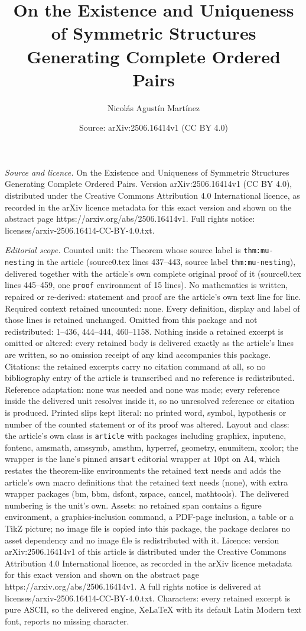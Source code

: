 \documentclass[10pt,a4paper]{amsart}
\title[On the Existence and Uniqueness of Symmetric Structures Gene]{On the Existence and Uniqueness of Symmetric Structures Generating Complete Ordered Pairs}
\author{Nicol\'as Agust\'in Mart\'inez}
\date{Source: arXiv:2506.16414v1 (CC BY 4.0)}
\begin{document}
\maketitle

\noindent\emph{Source and licence.} On the Existence and Uniqueness of Symmetric Structures Generating Complete Ordered Pairs. Version arXiv:2506.16414v1 (CC BY 4.0), distributed under the Creative Commons Attribution 4.0 International licence, as recorded in the arXiv licence metadata for this exact version and shown on the abstract page https://arxiv.org/abs/2506.16414v1. Full rights notice: licenses/arxiv-2506.16414-CC-BY-4.0.txt.\par\smallskip

\noindent\textit{Editorial scope.} Counted unit: the Theorem whose source label is \texttt{thm:mu-nesting} in the article (source0.tex lines 437--443, source label \texttt{thm:mu-nesting}), delivered together with the article's own complete original proof of it (source0.tex lines 445--459, one \texttt{proof} environment of 15 lines). No mathematics is written, repaired or re-derived: statement and proof are the article's own text line for line. Required context retained uncounted: none. Every definition, display and label of those lines is retained unchanged. Omitted from this package and not redistributed: 1--436, 444--444, 460--1158. Nothing inside a retained excerpt is omitted or altered: every retained body is delivered exactly as the article's lines are written, so no omission receipt of any kind accompanies this package. Citations: the retained excerpts carry no citation command at all, so no bibliography entry of the article is transcribed and no reference is redistributed. Reference adaptation: none was needed and none was made; every reference inside the delivered unit resolves inside it, so no unresolved reference or citation is produced. Printed slips kept literal: no printed word, symbol, hypothesis or number of the counted statement or of its proof was altered. Layout and class: the article's own class is \texttt{article} with packages including graphicx, inputenc, fontenc, amsmath, amssymb, amsthm, hyperref, geometry, enumitem, xcolor; the wrapper is the lane's pinned \texttt{amsart} editorial wrapper at 10pt on A4, which restates the theorem-like environments the retained text needs and adds the article's own macro definitions that the retained text needs (none), with extra wrapper packages (bm, bbm, dsfont, xspace, cancel, mathtools). The delivered numbering is the unit's own. Assets: no retained span contains a figure environment, a graphics-inclusion command, a PDF-page inclusion, a table or a TikZ picture; no image file is copied into this package, the package declares no asset dependency and no image file is redistributed with it. Licence: version arXiv:2506.16414v1 of this article is distributed under the Creative Commons Attribution 4.0 International licence, as recorded in the arXiv licence metadata for this exact version and shown on the abstract page https://arxiv.org/abs/2506.16414v1. A full rights notice is delivered at licenses/arxiv-2506.16414-CC-BY-4.0.txt. Characters: every retained excerpt is pure ASCII, so the delivered engine, XeLaTeX with its default Latin Modern text font, reports no missing character.
\end{document}
